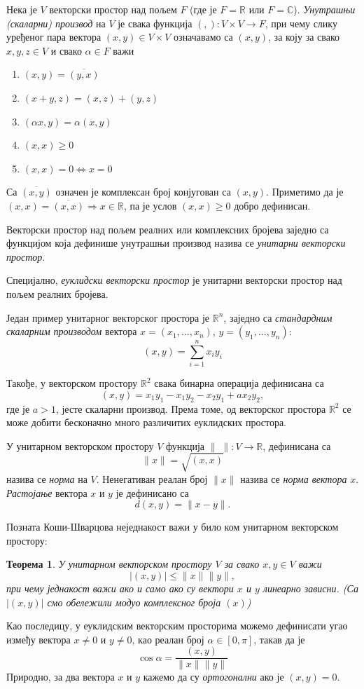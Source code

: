 \documentclass{report}
\theoremstyle{plain}
\newtheorem{thm}{Теорема}
\theoremstyle{definition}
\begin{document}
Нека је $V$ векторски простор над пољем $F$ (где је $F=\mathbb{R}$ или $F=\mathbb{C}$). \emph{Унутрашњи (скаларни) производ} на $V$ је свака функција $(,):V\times V\to F$, при чему слику уређеног пара вектора $(x, y)\in V\times V$ означавамо са $(x, y)$, за коју за свако $x, y, z\in V$ и свако $\alpha \in F$ важи
\begin{enumerate}
  \item $(x, y) = \overline{(y, x)}$
  \item $(x+y, z) = (x, z)+(y, z)$
  \item $(\alpha x, y) = \alpha (x, y)$
  \item $(x, x)\geq 0$
  \item $(x, x) = 0 \Leftrightarrow x=0$
\end{enumerate}
Са $\overline{(x, y)}$ означен је комплексан број конјугован са $(x, y)$. Приметимо да је $(x, x) = \overline{(x, x)} \Rightarrow x\in \mathbb{R}$, па је услов $(x, x)\geq 0$ добро дефинисан.

Векторски простор над пољем реалних или комплексних бројева заједно са функцијом која дефинише унутрашњи производ назива се \emph{унитарни векторски простор}.

Специјално, \emph{еуклидски векторски простор} је унитарни векторски простор над пољем реалних бројева.

Један пример унитарног векторског простора је $\mathbb{R}^n$, заједно са \emph{стандардним скаларним производом} вектора $x = (x_1, ..., x_n)$, $y = (y_1, ..., y_n)$:
$$(x, y) = \sum_{i=1}^{n} x_iy_i$$

Такође, у векторском простору $\mathbb{R}^2$ свака бинарна операција дефинисана са
$$(x, y) = x_1y_1 - x_1y_2 - x_2y_1 +ax_2y_2,$$
где је $a>1$, јесте скаларни производ. Према томе, од векторског простора $\mathbb{R}^2$ се може добити бесконачно много различитих еуклидских простора.

У унитарном векторском простору $V$ функција $\|\;\|:V\to \mathbb{R}$, дефинисана са $$\|x\| = \sqrt{(x, x)}$$ назива се \emph{норма} на $V$. Ненегативан реалан број $\|x\|$ назива се \emph{норма вектора} $x$.
\emph{Растојање} вектора $x$ и $y$ је дефинисано са $$d(x, y) = \|x-y\|.$$

Позната Коши-Шварцова неједнакост важи у било ком унитарном векторском простору:
\begin{thm}
У унитарном векторском простору $V$ за свако $x, y\in V$ важи
$$|(x, y)|\leq\|x\|\|y\|,$$
при чему једнакост важи ако и само ако су вектори $x$ и $y$ линеарно зависни. (Са $|(x, y)|$ смо обележили модуо комплексног броја $(x)$)
\end{thm}
Као последицу, у еуклидским векторским просторима можемо дефинисати угао између вектора $x\neq 0$ и $y\neq 0$, као реалан број $\alpha\in [0, \pi]$, такав да је $$\cos \alpha = \frac{(x, y)}{\|x\|\|y\|}$$
Природно, за два вектора $x$ и $y$ кажемо да су \emph{ортогонални} ако је $(x, y) = 0$.
\end{document}

